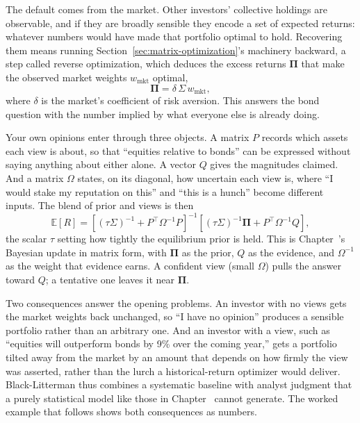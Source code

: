 \documentclass[../ai_in_finance]{subfiles}
\begin{document}
The default comes from the market. Other investors' collective holdings are observable, and if they are broadly sensible they encode a set of expected returns: whatever numbers would have made that portfolio optimal to hold. Recovering them means running Section~\ref{sec:matrix-optimization}'s machinery backward, a step called reverse optimization, which deduces the excess returns $\boldsymbol\Pi$ that make the observed market weights $w_{\text{mkt}}$ optimal,
\begin{equation}
\boldsymbol\Pi = \delta\,\Sigma\,w_{\text{mkt}},
\label{eq:portfolio-bl-equilibrium}
\end{equation}
where $\delta$ is the market's coefficient of risk aversion. This answers the bond question with the number implied by what everyone else is already doing.

Your own opinions enter through three objects. A matrix $P$ records which assets each view is about, so that ``equities relative to bonds'' can be expressed without saying anything about either alone. A vector $Q$ gives the magnitudes claimed. And a matrix $\Omega$ states, on its diagonal, how uncertain each view is, where ``I would stake my reputation on this'' and ``this is a hunch'' become different inputs. The blend of prior and views is then
\begin{equation}
\mathbb{E}[R] = \left[(\tau\Sigma)^{-1} + P^\top\Omega^{-1}P\right]^{-1}\left[(\tau\Sigma)^{-1}\boldsymbol\Pi + P^\top\Omega^{-1}Q\right],
\label{eq:portfolio-black-litterman}
\end{equation}
the scalar $\tau$ setting how tightly the equilibrium prior is held. This is Chapter~'s Bayesian update in matrix form, with $\boldsymbol\Pi$ as the prior, $Q$ as the evidence, and $\Omega^{-1}$ as the weight that evidence earns. A confident view (small $\Omega$) pulls the answer toward $Q$; a tentative one leaves it near $\boldsymbol\Pi$.

Two consequences answer the opening problems. An investor with no views gets the market weights back unchanged, so ``I have no opinion'' produces a sensible portfolio rather than an arbitrary one. And an investor with a view, such as ``equities will outperform bonds by 9\% over the coming year,'' gets a portfolio tilted away from the market by an amount that depends on how firmly the view was asserted, rather than the lurch a historical-return optimizer would deliver. Black-Litterman thus combines a systematic baseline with analyst judgment that a purely statistical model like those in Chapter~ cannot generate. The worked example that follows shows both consequences as numbers.
\end{document}
